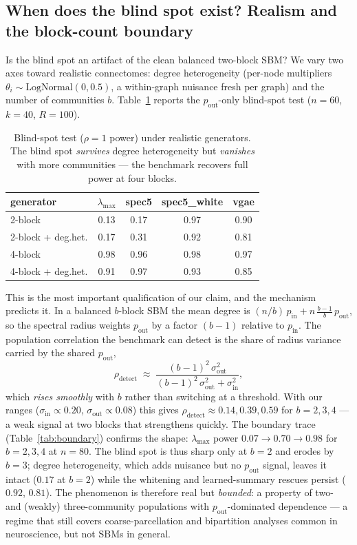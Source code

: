 \documentclass[11pt]{article}
\begin{document}
\subsection{When does the blind spot exist? Realism and the block-count
boundary}\label{sec:realism}

Is the blind spot an artifact of the clean balanced two-block SBM? We vary two
axes toward realistic connectomes: degree heterogeneity (per-node multipliers
$\theta_i \sim \mathrm{LogNormal}(0, 0.5)$, a within-graph nuisance fresh per
graph) and the number of communities $b$. Table~\ref{tab:realism} reports the
$p_{\mathrm{out}}$-only blind-spot test ($n = 60$, $k = 40$, $R = 100$).

\begin{table}[ht]
\centering
\small
\caption{Blind-spot test ($\rho = 1$ power) under realistic generators. The
blind spot \emph{survives} degree heterogeneity but \emph{vanishes} with more
communities --- the benchmark recovers full power at four blocks.}
\label{tab:realism}
\begin{tabular}{lcccc}
\toprule
generator & $\lambda_{\max}$ & spec5 & spec5\_white & vgae \\
\midrule
2-block            & 0.13 & 0.17 & 0.97 & 0.90 \\
2-block + deg.het. & 0.17 & 0.31 & 0.92 & 0.81 \\
4-block            & 0.98 & 0.96 & 0.98 & 0.97 \\
4-block + deg.het. & 0.91 & 0.97 & 0.93 & 0.85 \\
\bottomrule
\end{tabular}
\end{table}

This is the most important qualification of our claim, and the mechanism
predicts it. In a balanced $b$-block SBM the mean degree is
$(n/b)\,p_{\mathrm{in}} + n\,\tfrac{b-1}{b}\,p_{\mathrm{out}}$, so the spectral
radius weights $p_{\mathrm{out}}$ by a factor $(b-1)$ relative to
$p_{\mathrm{in}}$. The population correlation the benchmark can detect is the
share of radius variance carried by the shared $p_{\mathrm{out}}$,
\[
\rho_{\mathrm{detect}} \;\approx\;
\frac{(b-1)^2\,\sigma^2_{\mathrm{out}}}
{(b-1)^2\,\sigma^2_{\mathrm{out}} + \sigma^2_{\mathrm{in}}},
\]
which \emph{rises smoothly} with $b$ rather than switching at a threshold. With
our ranges ($\sigma_{\mathrm{in}} \propto 0.20$,
$\sigma_{\mathrm{out}} \propto 0.08$) this gives $\rho_{\mathrm{detect}}
\approx 0.14, 0.39, 0.59$ for $b = 2, 3, 4$ --- a weak signal at two blocks that
strengthens quickly. The boundary trace (Table~\ref{tab:boundary}) confirms the
shape: $\lambda_{\max}$ power $0.07 \to 0.70 \to 0.98$ for $b = 2, 3, 4$ at
$n = 80$. The blind spot is thus sharp only at $b = 2$ and erodes by $b = 3$;
degree heterogeneity, which adds nuisance but no $p_{\mathrm{out}}$ signal,
leaves it intact ($0.17$ at $b = 2$) while the whitening and learned-summary
rescues persist ($0.92$, $0.81$). The phenomenon is therefore real but
\emph{bounded}: a property of two- and (weakly) three-community populations
with $p_{\mathrm{out}}$-dominated dependence --- a regime that still covers
coarse-parcellation and bipartition analyses common in neuroscience, but not
SBMs in general.
\end{document}
